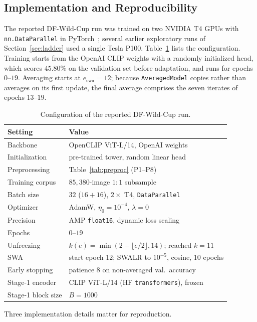 \documentclass[10pt,journal]{IEEEtran}
\begin{document}
\subsection{Implementation and Reproducibility}\label{sec:repro}
The reported DF-Wild-Cup run was trained on two NVIDIA T4 GPUs with
\texttt{nn.DataParallel} in PyTorch~\cite{paszke2019pytorch}; several earlier
exploratory runs of Section~\ref{sec:ladder} used a single Tesla P100.
Table~\ref{tab:hyper} lists the configuration. Training starts from the OpenAI
CLIP weights with a randomly initialized head, which scores $45.80\%$ on the
validation set before adaptation, and runs for epochs $0$--$19$. Averaging
starts at $e_{\mathrm{swa}}=12$; because \texttt{AveragedModel} copies rather
than averages on its first update, the final average comprises the seven
iterates of epochs $13$--$19$.

\begin{table}[!tb]
\caption{Configuration of the reported DF-Wild-Cup run.}
\label{tab:hyper}
\centering
\footnotesize
\begin{tabular}{@{}ll@{}}
\toprule
Setting & Value \\
\midrule
Backbone & OpenCLIP ViT-L/14, OpenAI weights \\
Initialization & pre-trained tower, random linear head \\
Preprocessing & Table~\ref{tab:preproc} (P1--P8) \\
Training corpus & $85{,}380$-image $1{:}1$ subsample \\
Batch size & $32$ ($16{+}16$), $2\times$ T4, \texttt{DataParallel} \\
Optimizer & AdamW, $\eta_0=10^{-4}$, $\lambda=0$ \\
Precision & AMP \texttt{float16}, dynamic loss scaling \\
Epochs & $0$--$19$ \\
Unfreezing & $k(e)=\min(2+\lfloor e/2\rfloor,14)$; reached $k=11$ \\
SWA & start epoch $12$; SWALR to $10^{-5}$, cosine, $10$ epochs \\
Early stopping & patience $8$ on non-averaged val.\ accuracy \\
Stage-1 encoder & CLIP ViT-L/14 (HF \texttt{transformers}), frozen \\
Stage-1 block size & $B=1000$ \\
\bottomrule
\end{tabular}
\end{table}

Three implementation details matter for reproduction.
\end{document}
